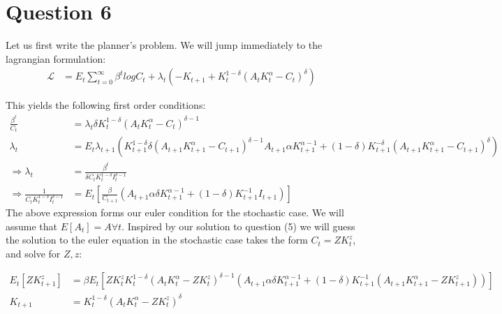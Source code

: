 \documentclass[11pt]{article} %
\begin{document}
\section{Question 6}
Let us first write the planner's problem. We will jump immediately to the lagrangian formulation:
\begin{align*}
\mathcal{L} &= E_t\sum_{t=0}^{\infty} \beta^t log C_t + \lambda_t\left(-K_{t+1}+ K_t^{1-\delta}\left( A_tK_t^{\alpha}  - C_t \right)^{\delta}\right)
\end{align*}

This yields the following first order conditions:
\begin{align*}
\frac{\beta^t}{C_t} &= \lambda_t \delta K_t^{1-\delta}(A_tK_t^{\alpha}  - C_t )^{\delta - 1}\\
\lambda_t &= E_t\lambda_{t+1}(K_{t+1}^{1-\delta}\delta(A_{t+1}K_{t+1}^{\alpha}  - C_{t+1} )^{\delta - 1}A_{t+1}\alpha K_{t+1}^{\alpha - 1} + (1-\delta)K_{t+1}^{-\delta} \left( A_{t+1}K_{t+1}^{\alpha}  - C_{t+1} \right)^{\delta})\\
\Rightarrow \lambda_t &= \frac{\beta^t}{\delta C_tK_t^{1-\delta}I_t^{\delta - 1}} \\
\Rightarrow  \frac{1}{C_tK_t^{1-\delta}I_t^{\delta - 1}}  &=  E_t\left[\frac{\beta}{C_{t+1}}(A_{t+1}\alpha \delta K_{t+1}^{\alpha - 1} + (1-\delta)K_{t+1}^{-1}I_{t+1})\right]
\end{align*}
The above expression forms our euler condition for the stochastic case. 
We will assume that $E[A_t] = A \forall t$. Inspired by our solution to question (5) we will guess the solution to the euler equation in the stochastic case takes the form $C_{t} = ZK_t^{z}$, and solve for $Z,z$:

\begin{align*}
E_t[ZK_{t+1}^z]&= \beta  E_t[ZK_t^{z} K_t^{1-\delta}(A_tK_t^{\alpha} -  ZK_t^{z})^{\delta - 1}(A_{t+1}\alpha \delta K_{t+1}^{\alpha - 1}  + (1-\delta)K_{t+1}^{-1}(A_{t+1}K_{t+1}^{\alpha} -  ZK_{t+1}^{z}) )]\\
K_{t+1} &= K_t^{1-\delta}(A_tK_t^{\alpha} -  ZK_t^{z})^{\delta}
\end{align*}
\end{document}
